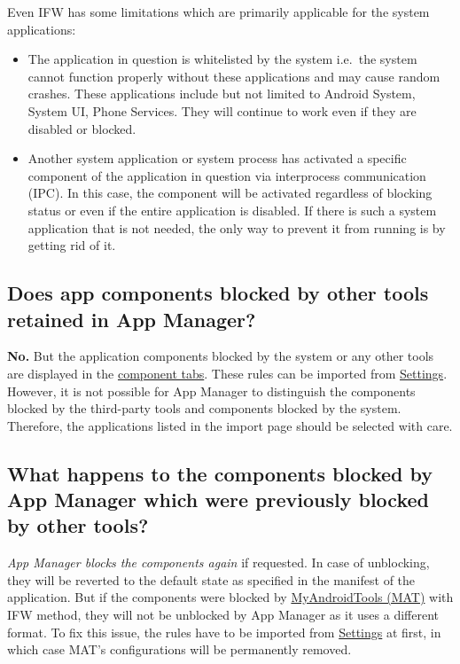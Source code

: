Even IFW has some limitations which are primarily applicable for the system applications:
\begin{itemize}
    \item The application in question is whitelisted by the system i.e.\ the system cannot function properly without
    these applications and may cause random crashes. These applications include but not limited to Android System,
    System UI, Phone Services. They will continue to work even if they are disabled or blocked.

    \item Another system application or system process has activated a specific component of the application in question
    via interprocess communication (IPC). In this case, the component will be activated regardless of blocking status or
    even if the entire application is disabled. If there is such a system application that is not needed, the only way
    to prevent it from running is by getting rid of it.
\end{itemize}

\subsection{Does app components blocked by other tools retained in App Manager?}\label{subsec:faq:components-blocked-by-others} %
\textbf{No.} But the application components blocked by the system or any other tools are displayed in the
\hyperref[subsec:component-tabs]{component tabs}. These rules can be imported from \hyperref[par:import-existing-rules]{Settings}.
However, it is not possible for App Manager to distinguish the components blocked by the third-party tools and
components blocked by the system. Therefore, the applications listed in the import page should be selected with care.

\subsection{What happens to the components blocked by App Manager which were previously blocked by other tools?}\label{subsec:faq:components-reblocked-in-am} %
\textit{App Manager blocks the components again} if requested. In case of unblocking, they will be reverted to the
default state as specified in the manifest of the application. But if the components were blocked by
\href{https://www.myandroidtools.com}{MyAndroidTools (MAT)} with IFW method, they will not be unblocked by App Manager
as it uses a different format. To fix this issue, the rules have to be imported from \hyperref[par:import-existing-rules]{Settings}
at first, in which case MAT's configurations will be permanently removed.

